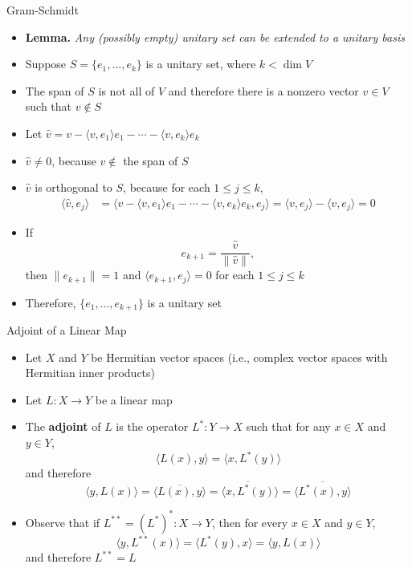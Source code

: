 \documentclass[usenames,dvipsnames,10pt]{beamer}
\begin{document}
\begin{frame}
  {Gram-Schmidt}

  \begin{itemize}
  \item {\bf Lemma.} {\em Any (possibly empty) unitary set can be extended to a unitary basis}
  \item Suppose $S = \{ e_1, \dots, e_k\}$ is a unitary set, where $k < \dim V$
  \item The span of $S$ is not all of $V$ and therefore there is a nonzero vector $v \in V$ such that $v \notin S$
  \item Let
    $\hat{v} = v - \langle v, e_1\rangle e_1 - \cdots - \langle v,e_k\rangle e_k$
  \item $\hat{v} \ne 0$, because $v \notin$ the span of $S$
  \item $\hat{v}$ is orthogonal to $S$, because for each $1 \le j \le k$,
    \begin{align*}
      \langle \hat{v}, e_j\rangle &= \langle v - \langle v, e_1\rangle e_1 - \cdots - \langle v,e_k\rangle e_k, e_j\rangle
                                    = \langle v,e_j\rangle - \langle v,e_j\rangle
                                    = 0
    \end{align*}
  \item If
    \[
      e_{k+1} = \frac{\hat{v}}{\|\hat{v}\|},
    \]
    then $\|e_{k+1}\| = 1$ and $\langle e_{k+1},e_j\rangle = 0$ for each $1 \le j \le k$
  \item Therefore, $\{ e_1, \dots, e_{k+1}\}$ is a unitary set
  \end{itemize}
\end{frame}

\begin{frame}
  {Adjoint of a Linear Map}

  \begin{itemize}
  \item Let $X$ and $Y$ be Hermitian vector spaces (i.e., complex vector spaces with Hermitian inner products)
  \item Let $L: X \rightarrow Y$ be a linear map
  \item The {\bf adjoint} of $L$ is the operator $L^*: Y \rightarrow X$ such that for any $x \in X$ and $y \in Y$,
    \[
      \langle L(x), y \rangle = \langle x, L^*(y)\rangle
    \]
    and therefore
    \[
      \langle y, L(x)\rangle = \overline{\langle L(x), y\rangle} = \overline{\langle x, L^*(y)}\rangle = \overline{\langle L^*(x),y\rangle}
    \]
  \item Observe that if $L^{**} = (L^*)^*: X \rightarrow Y$, then for every $x \in X$ and $y \in Y$,
    \[
      \langle y, L^{**}(x)\rangle = \langle L^*(y), x\rangle = \langle y, L(x)\rangle
    \]
    and therefore $L^{**} = L$
  \end{itemize}
\end{frame}
\end{document}
